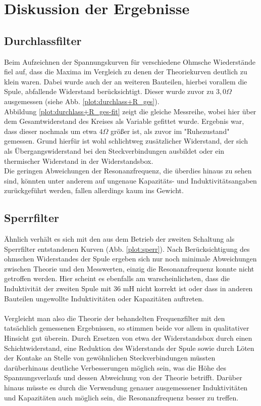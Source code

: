 \section{Diskussion der Ergebnisse}

\subsection{Durchlassfilter}
Beim Aufzeichnen der Spannungskurven für verschiedene Ohmsche Wiederstände fiel auf, dass die Maxima im Vergleich zu denen der Theoriekurven deutlich zu klein waren. Dabei wurde auch der an weiteren Bauteilen, hierbei vorallem die Spule, abfallende Widerstand berücksichtigt. Dieser wurde zuvor zu $ 3,0 \Omega $ ausgemessen (siehe Abb. \ref{plot:durchlass+R_ges}).\\
Abbildung \ref{plot:durchlass+R_ges-fit} zeigt die gleiche Messreihe, wobei hier über dem Gesamtwiderstand des Kreises als Variable gefittet wurde. Ergebnis war, dass dieser nochmals um etwa $ 4 \Omega $ größer ist, als zuvor im "Ruhezustand" gemessen. Grund hierfür ist wohl schlichtweg zusätzlicher Widerstand, der sich als Übergangswiderstand bei den Steckverbindungen ausbildet oder ein thermischer Widerstand in der Widerstandsbox.\\
Die geringen Abweichungen der Resonanzfrequenz, die überdies hinaus zu sehen sind, könnten unter anderem auf ungenaue Kapazitäts- und Induktivitätsangaben zurückgeführt werden, fallen allerdings kaum ins Gewicht.
\subsection{Sperrfilter}
Ähnlich verhält es sich mit den aus dem Betrieb der zweiten Schaltung als Sperrfilter entstandenen Kurven (Abb. \ref{plot:sperr}). Nach Berücksichtigung des ohmschen Widerstandes der Spule ergeben sich nur noch minimale Abweichungen zwischen Theorie und den Messwerten, einzig die Resonanzfrequenz konnte nicht getroffen werden. Hier scheint es ebenfalls am warscheinlichsten, dass die Induktivität der zweiten Spule mit 36 mH nicht korrekt ist oder dass in anderen Bauteilen ungewollte Induktivitäten oder Kapazitäten auftreten.
\paragraph{}Vergleicht man also die Theorie der behandelten Frequenzfilter mit den tatsächlich gemessenen Ergebnissen, so stimmen beide vor allem in qualitativer Hinsicht gut überein. Durch Ersetzen von etwa der Widerstandsbox durch einen Schichtwiderstand, eine Reduktion des Widerstands der Spule sowie durch Löten der Kontake an Stelle von gewöhnlichen Steckverbindungen müssten darüberhinaus deutliche Verbesserungen möglich sein, was die Höhe des Spannungsverlaufs und dessen Abweichung von der Theorie betrifft. 
Darüber hinaus müsste es durch die Verwendung genauer ausgemessener Induktivitäten und Kapazitäten auch möglich sein, die Resonanzfrequenz besser zu treffen. 

